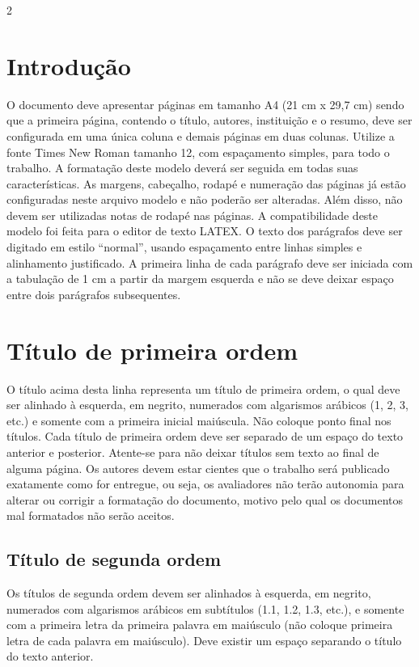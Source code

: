 \documentclass[a4paper,12pt,fleqn]{article}
\begin{document}
	\begin{multicols}{2}

		\section{Introdução}

		O documento deve apresentar páginas em tamanho A4 (21 cm x 29,7 cm) sendo que a primeira página, contendo o título, autores, instituição e o resumo, deve ser configurada em uma única coluna e demais páginas em duas colunas. Utilize a fonte Times New Roman tamanho 12, com espaçamento simples, para todo o trabalho. A formatação deste modelo deverá ser seguida em todas suas características. As margens, cabeçalho, rodapé e numeração das páginas já estão configuradas neste arquivo modelo e não poderão ser alteradas. Além disso, não devem ser utilizadas notas de rodapé nas páginas. A compatibilidade deste modelo foi feita para o editor de texto LATEX. O texto dos parágrafos deve ser digitado em estilo “normal”, usando espaçamento entre linhas simples e alinhamento justificado. A primeira linha de cada parágrafo deve ser iniciada com a tabulação de 1 cm a partir da margem esquerda e não se deve deixar espaço entre dois parágrafos subsequentes. 

		\section{Título de primeira ordem}
		O título acima desta linha representa um título de primeira ordem, o qual deve ser alinhado à esquerda, em negrito, numerados com algarismos arábicos (1, 2, 3, etc.) e somente com a primeira inicial maiúscula. Não coloque ponto final nos títulos. Cada título de primeira ordem deve ser separado de um espaço do texto anterior e posterior. Atente-se para não deixar títulos sem texto ao final de alguma página. Os autores devem estar cientes que o trabalho será publicado exatamente como for entregue, ou seja, os avaliadores não terão autonomia para alterar ou corrigir a formatação do documento, motivo pelo qual os documentos mal formatados não serão aceitos. 

		\subsection{Título de segunda ordem}
		Os títulos de segunda ordem devem ser alinhados à esquerda, em negrito, numerados com algarismos arábicos em subtítulos (1.1, 1.2, 1.3, etc.), e somente com a primeira letra da primeira palavra em maiúsculo (não coloque primeira letra de cada palavra em maiúsculo). Deve existir um espaço separando o título do texto anterior. 


\end{multicols}
\end{document}
